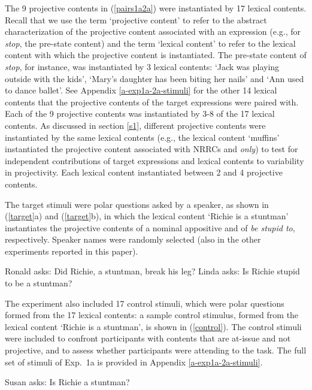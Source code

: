 \documentclass[11pt,fleqn]{article}
\newcommand{\6}{\mbox{$[\hspace*{-.6mm}[$}}
\newcommand{\9}{\mbox{$]\hspace*{-.6mm}]$}}
\newcommand{\sectionref}[1]{section \ref{#1}}
\begin{document}
The 9 projective contents in (\ref{pairs1a2a}) were instantiated by 17 lexical contents. Recall that we use the term `projective content' to refer to the abstract characterization of the projective content associated with an expression (e.g., for {\em stop}, the pre-state content) and the term `lexical content' to refer to the lexical content with which the projective content is instantiated. The pre-state content of {\em stop}, for instance, was instantiated by 3 lexical contents: `Jack was playing outside with the kids', `Mary's daughter has been biting her nails' and `Ann used to dance ballet'. See Appendix \ref{a-exp1a-2a-stimuli} for the other 14 lexical contents that the projective contents of the target expressions were paired with. Each of the 9 projective contents was instantiated by 3-8 of the 17 lexical contents. As discussed in \sectionref{s1}, different projective contents were instantiated by the same lexical contents (e.g., the lexical content `muffins' instantiated the projective content associated with NRRCs and {\em only}) to test for independent contributions of target expressions and lexical contents to variability in projectivity. Each lexical content instantiated between 2 and 4 projective contents.

The target stimuli were polar questions asked by a speaker, as shown in (\ref{target}a) and (\ref{target}b), in which the lexical content `Richie is a stuntman' instantiates the projective contents of a nominal appositive and of {\em be stupid to}, respectively. Speaker names were randomly selected (also in the other experiments reported in this paper).

\begin{exe}
\ex\label{target}
\begin{xlist}
\ex Ronald asks: Did Richie, a stuntman, break his leg?
\ex Linda asks: Is Richie stupid to be a stuntman?
\end{xlist}
\end{exe}

The experiment also included 17 control stimuli, which were polar questions formed from the 17 lexical contents: a sample control stimulus, formed from the lexical content `Richie is a stuntman', is shown in (\ref{control}). The control stimuli were included to confront participants with contents that are at-issue and not projective, and to assess whether participants were attending to the task. The full set of stimuli of Exp.~1a is provided in Appendix \ref{a-exp1a-2a-stimuli}.

\begin{exe}
\ex\label{control} Susan asks: Is Richie a stuntman?
\end{exe}
\end{document}
